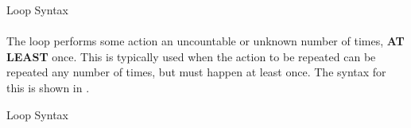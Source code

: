 \begin{listing}[h!tbp]
\caption{\texorpdfstring{}{\texttt{for}} Loop Syntax}
\label{lst:for_Loop}
\end{listing}

\paragraph{\texorpdfstring{}{\texttt{do while}}}\label{par:dowhile_Loop}
The  loop performs some action an uncountable or unknown number of times, \textbf{AT LEAST} once.
This is typically used when the action to be repeated can be repeated any number of times, but must happen at least once.
The syntax for this is shown in .

\begin{listing}[h!tbp]
\caption{\texorpdfstring{}{\texttt{do while}} Loop Syntax}
\label{lst:dowhile_Loop}
\end{listing}

